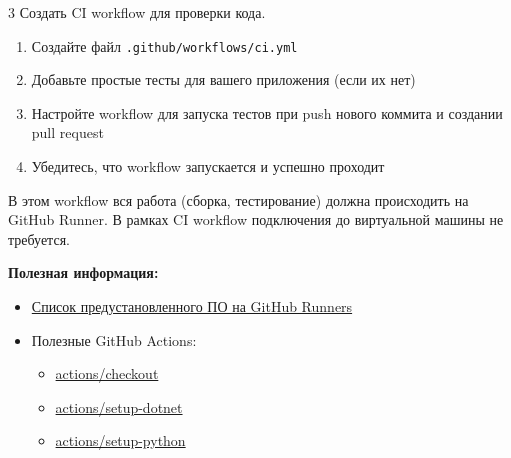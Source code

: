 \documentclass[12pt,a4paper]{article}
\begin{document}
\begin{task}{3}
    Создать CI workflow для проверки кода.
    
    \begin{enumerate}
        \item Создайте файл \texttt{.github/workflows/ci.yml}
        \item Добавьте простые тесты для вашего приложения (если их нет)
        \item Настройте workflow для запуска тестов при push нового коммита и создании pull request
        \item Убедитесь, что workflow запускается и успешно проходит
    \end{enumerate}

    В этом workflow вся работа (сборка, тестирование) должна происходить на GitHub Runner.
    В рамках CI workflow подключения до виртуальной машины не требуется.

    \textbf{Полезная информация:}
    \begin{itemize}
        \item \href{https://github.com/actions/runner-images?tab=readme-ov-file#available-images}{Список предустановленного ПО на GitHub Runners}
        \item Полезные GitHub Actions: 
        \begin{itemize}
            \item \href{https://github.com/actions/checkout}{actions/checkout}
            \item \href{https://github.com/actions/setup-dotnet}{actions/setup-dotnet}
            \item \href{https://github.com/actions/setup-python}{actions/setup-python}
        \end{itemize}
    \end{itemize}
\end{task}
\end{document}
